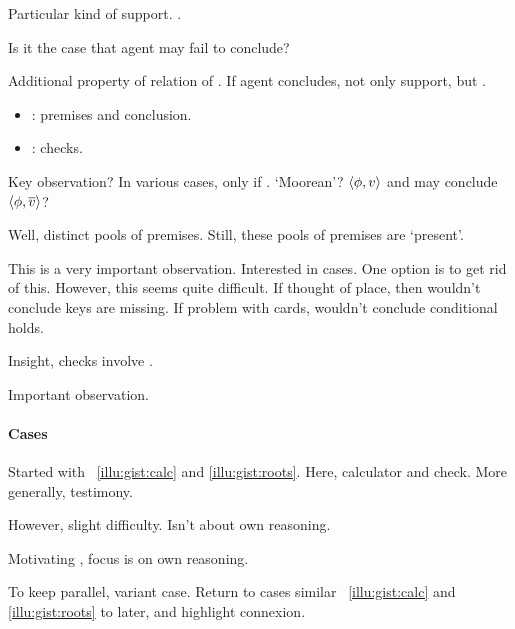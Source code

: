 \begin{note}[`\zS{}']
  Particular kind of support.
  \zS{}.

  Is it the case that agent may fail to conclude?

  Additional property of relation of \bS{}.
  If agent concludes, not only support, but \zS{}.
  \begin{itemize}
  \item
    : premises and conclusion.
  \item
    \zS{}: checks.
  \end{itemize}

  Key observation?
  In various cases, \bS{} only if \zS{}.
  `Moorean'?
  \(\langle \phi, v \rangle\) and may conclude \(\langle \phi, \overline{v} \rangle\)?

  Well, distinct pools of premises.
  Still, these pools of premises are `present'.

  This is a very important observation.
  Interested in \zS{} cases.
  One option is to get rid of this.
  However, this seems quite difficult.
  If thought of place, then wouldn't conclude keys are missing.
  If problem with cards, wouldn't conclude conditional holds.

  Insight, checks involve .
\end{note}

\begin{note}
  Important observation.
\end{note}

\paragraph*{Cases}

\begin{note}[Shifting]
  Started with ~\ref{illu:gist:calc} and \ref{illu:gist:roots}.
  Here, calculator and check.
  More generally, testimony.

  However, slight difficulty.
  Isn't about own reasoning.

  Motivating \zS{}, focus is on own reasoning.

  To keep parallel, variant case.
  Return to cases similar ~\ref{illu:gist:calc} and \ref{illu:gist:roots} to later, and highlight connexion.
\end{note}

